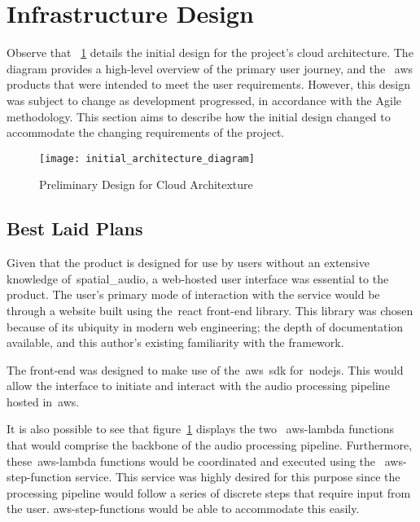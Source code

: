 \thispagestyle{plain}
\newpage
\section{Infrastructure Design}\label{sec:infrastructure-design}

\normalsize

Observe that ~\ref{fig:preliminary-design} details the initial design for the project’s cloud architecture.
The diagram provides a high-level overview of the primary user journey,
and the ~\gls{aws} products that were intended to meet the user requirements.
However, this design was subject to change as development progressed, in accordance with the Agile methodology.
This section aims to describe how the initial design changed to accommodate the changing requirements of the project.

\begin{figure}[!htb]
    \minipage{\textwidth}
    \texttt{[image: initial\_architecture\_diagram]}
    \caption{Preliminary Design for Cloud Architexture}\label{fig:preliminary-design}
    \endminipage\hfill
\end{figure}

\subsection{Best Laid Plans}\label{subsec:best-laid-plans}

Given that the product is designed for use by users without an extensive knowledge of~\gls{spatial_audio},
a web-hosted user interface was essential to the product.
The user’s primary mode of interaction with the service would be through a website
built using the~\gls{react} front-end library.
This library was chosen because of its ubiquity in modern web engineering; the depth of documentation available,
and this author’s existing familiarity with the framework.

The front-end was designed to make use of the~\gls{aws}~\gls{sdk} for~\gls{nodejs}.
This would allow the interface to initiate and interact with the audio processing pipeline hosted in~\gls{aws}.

It is also possible to see
that figure~\ref{fig:preliminary-design} displays the two ~\gls{aws-lambda} functions
that would comprise the backbone of the audio processing pipeline.
Furthermore,
these~\gls{aws-lambda} functions would be coordinated and executed using the ~\gls{aws-step-function} service.
This service was highly desired for this purpose
since the processing pipeline would follow a series of discrete steps that require input from the user.
\glspl{aws-step-function} would be able to accommodate this easily.

